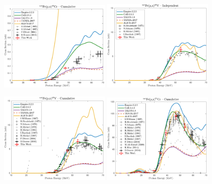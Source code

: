 \begin{figure}
 \centering
 \includegraphics[width=0.49\textwidth]{./figures/48Cr.pdf}
 \includegraphics[width=0.49\textwidth]{./figures/48V_ind.pdf}
 
 
 \includegraphics[width=0.49\textwidth]{./figures/48V_cum.pdf}
 \includegraphics[width=0.49\textwidth]{./figures/51Cr_cum.pdf}
 

\end{figure}
